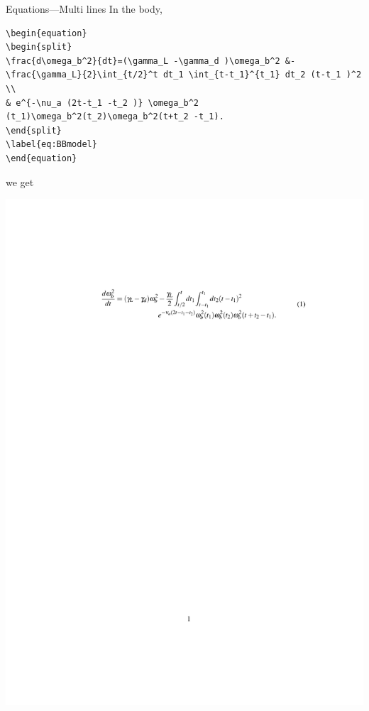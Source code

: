 \documentclass[12pt]{gshs_lecture}
\begin{document}
\begin{frame}[t,fragile]{Equations---Multi lines}\small
In the body,
\begin{block}{}
\begin{lstlisting}
\begin{equation}
\begin{split}
\frac{d\omega_b^2}{dt}=(\gamma_L -\gamma_d )\omega_b^2 &-\frac{\gamma_L}{2}\int_{t/2}^t dt_1 \int_{t-t_1}^{t_1} dt_2 (t-t_1 )^2 \\
& e^{-\nu_a (2t-t_1 -t_2 )} \omega_b^2 (t_1)\omega_b^2(t_2)\omega_b^2(t+t_2 -t_1).
\end{split}
\label{eq:BBmodel}
\end{equation}
\end{lstlisting}
\end{block}
we get
\begin{center}
\begin{framed}
\includegraphics[width=\textwidth,trim={0cm 22cm 0cm 4.6cm},clip]{./test_article/article010.pdf}
\end{framed}
\end{center}
\end{frame}
\end{document}
